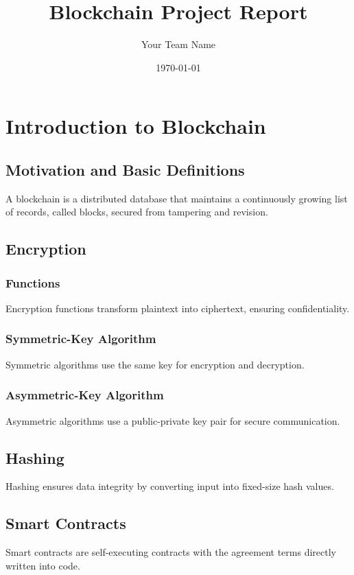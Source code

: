 \documentclass[12pt,a4paper]{report}
\title{\color{headercolor}\textbf{Blockchain Project Report}}
\author{Your Team Name}
\date{\today}
\begin{document}
\maketitle


\renewcommand{\contentsname}{\color{headercolor}\textbf{Table of Contents}}
\tableofcontents

\chapter{Introduction to Blockchain}
\section{Motivation and Basic Definitions}
A blockchain is a distributed database that maintains a continuously growing list of records, called blocks, secured from tampering and revision.

\section{Encryption}
\subsection{Functions}
Encryption functions transform plaintext into ciphertext, ensuring confidentiality.
\subsection{Symmetric-Key Algorithm}
Symmetric algorithms use the same key for encryption and decryption.
\subsection{Asymmetric-Key Algorithm}
Asymmetric algorithms use a public-private key pair for secure communication.

\section{Hashing}
Hashing ensures data integrity by converting input into fixed-size hash values.

\section{Smart Contracts}
Smart contracts are self-executing contracts with the agreement terms directly written into code.
\end{document}
